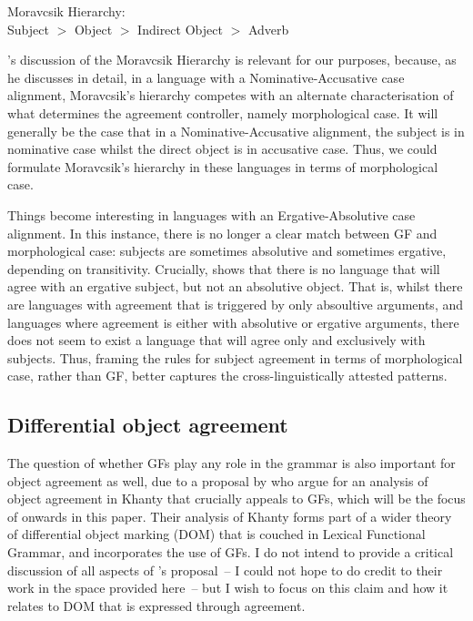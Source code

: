 \documentclass[output=paper
,modfonts
,nonflat]{langsci/langscibook}
\begin{document}
\begin{exe}
\ex Moravcsik Hierarchy:\\
Subject $>$ Object $>$ Indirect Object $>$ Adverb
\end{exe}

\noindent \citeauthor{Bobaljik2008}'s discussion of the Moravcsik Hierarchy is relevant for our purposes, because, as he discusses in detail, in a language with a Nominative-Accusative case alignment, Moravcsik's hierarchy competes with an alternate characterisation of what determines the agreement controller, namely morphological case. 
It will generally be the case that in a Nominative-Accusative alignment, the subject is in nominative case whilst the direct object is in accusative case. 
Thus, we could formulate Moravcsik's hierarchy in these languages in terms of morphological case.

Things become interesting in languages with an Ergative-Absolutive case alignment. In this instance, there is no longer a clear match between GF and morphological case: subjects are sometimes absolutive and sometimes ergative, depending on transitivity. Crucially, \citeauthor{Bobaljik2008} shows that there is no language that will agree with an ergative subject, but not an absolutive object.
That is, whilst there are languages with agreement that is triggered by only absoultive arguments, and languages where agreement is either with absolutive or ergative arguments, there does not seem to exist a language that will agree only and exclusively with subjects.
Thus, framing the rules for subject agreement in terms of morphological case, rather than GF, better captures the cross-linguistically attested patterns. 

\subsection{Differential object agreement}

The question of whether GFs play any role in the grammar is also important for object agreement as well, due to a proposal by \citet{dn2011} who argue for an analysis of object agreement in Khanty that crucially appeals to GFs, which will be the focus of  onwards in this paper.
Their analysis of Khanty forms part of a wider theory of differential object marking (DOM) that is couched in Lexical Functional Grammar, and incorporates the use of GFs. I do not intend to provide a critical discussion of all aspects of \citeauthor{dn2011}'s proposal~-- I could not hope to do credit to their work in the space provided here~-- but I wish to focus on this claim and how it relates to DOM that is expressed through agreement.
\end{document}
